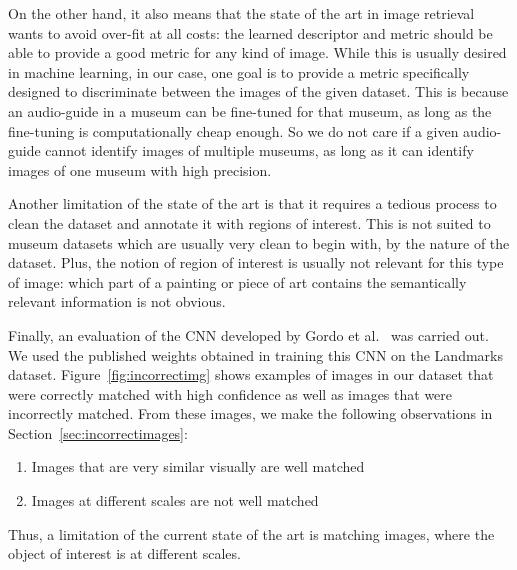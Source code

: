 On the other hand, it also means that the state of the art in
image retrieval wants to avoid over-fit at all costs:
the learned descriptor and metric should
be able to provide a good metric for any kind of image.
While this is usually desired in machine learning, in our case,
one goal is to provide a metric specifically designed
to discriminate between the images of the given dataset. This is because
an audio-guide in a museum can be fine-tuned for that museum, as long
as the fine-tuning is computationally cheap enough. So we do not care
if a given audio-guide cannot identify images of multiple museums,
as long as it can identify images of one museum with high precision.

Another limitation of the state of the art is that it requires
a tedious process to clean the dataset and annotate it with regions of
interest. This is not suited to museum datasets which are usually very
clean to begin with, by the nature of the dataset. Plus, the notion of
region of interest is usually not relevant for this type of image:
which part of a painting or piece of art contains the semantically
relevant information is not obvious.

Finally, an evaluation of the CNN developed by
Gordo et al.~\cite{gordo_deep_2016} was carried out.
We used the published weights obtained in training this CNN on the
Landmarks dataset.
Figure~\ref{fig:incorrectimg}
shows examples of images in our dataset that were correctly matched
with high confidence as well as images that were incorrectly matched.
From these images, we make the following observations in
Section~\ref{sec:incorrectimages}:

\begin{enumerate}
    \item Images that are very similar visually are well matched
    \item Images at different scales are not well matched
\end{enumerate}

Thus, a limitation of the current state of the art is matching
images, where the object of interest is at different scales.
